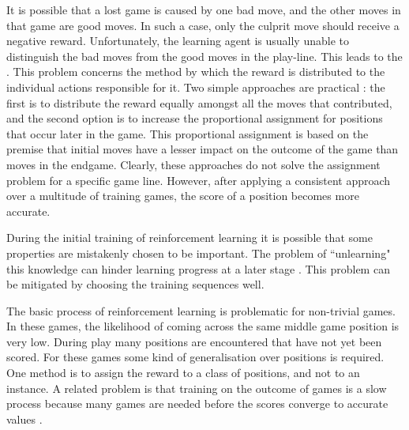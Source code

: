 It is possible that a lost game is caused by one bad move, and the other moves in that game are good moves.  In such a case, only the culprit move should receive a negative reward. Unfortunately, the learning agent is usually unable to distinguish the bad moves from the good moves in the play-line.  This leads to the  \cite{minsky:steps}. This problem concerns the method by which the reward is distributed to the individual actions responsible for it. Two simple approaches are practical \cite{michie:game}: the first is to distribute the reward equally amongst all the moves that contributed, and the second option is to increase the proportional assignment for positions that occur later in the game.  This proportional assignment is based on the premise that initial moves have a lesser impact on the outcome of the game than moves in the endgame.  Clearly, these approaches do not solve the assignment problem for a specific game line. However, after applying a consistent approach over a multitude of training games, the score of a position becomes more accurate.

During the initial training of reinforcement learning it is possible that some properties are mistakenly chosen to be important.  The problem of ``unlearning" this knowledge can hinder learning progress at a later stage \cite{minsky:steps}.  This problem can be mitigated by choosing the training sequences well.

The basic process of reinforcement learning is problematic for non-trivial games. In these games, the likelihood of coming across the same middle game position is very low. During play many positions are encountered that have not yet been scored.  For these games some kind of generalisation over positions is required.  One method is to assign the reward to a class of positions, and not to an instance. A related problem is that training on the outcome of games is a slow process because many games are needed before the scores converge to accurate values \cite{buro:statistical}.
